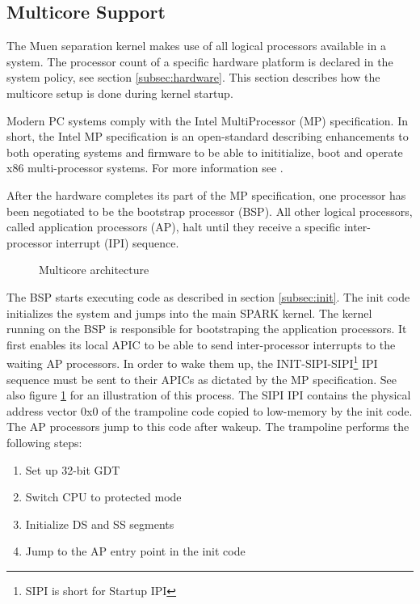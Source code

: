 \subsection{Multicore Support}\label{subsec:mp-support}
The Muen separation kernel makes use of all logical processors available in a
system. The processor count of a specific hardware platform is declared in the
system policy, see section \ref{subsec:hardware}. This section describes how
the multicore setup is done during kernel startup.

Modern PC systems comply with the Intel MultiProcessor (MP)
specification. In short, the Intel MP specification is an open-standard
describing enhancements to both operating systems and firmware to be able to
inititialize, boot and operate x86 multi-processor systems. For more information
see \cite{intel:mp}.

After the hardware completes its part of the MP specification, one processor
has been negotiated to be the bootstrap processor (BSP). All other
logical processors, called application processors (AP), halt until
they receive a specific inter-processor interrupt (IPI) sequence.

\begin{figure}[h]
	\centering
	
	\caption{Multicore architecture}
	\label{fig:mp-overview}
\end{figure}

The BSP starts executing code as described in section \ref{subsec:init}. The
init code initializes the system and jumps into the main SPARK kernel. The
kernel running on the BSP is responsible for bootstraping the application
processors. It first enables its local APIC to be able to send
inter-processor interrupts to the waiting AP processors. In order to wake them
up, the INIT-SIPI-SIPI\footnote{SIPI is short for Startup
IPI} IPI sequence must be sent to their
APICs as dictated by the MP specification. See also figure
\ref{fig:mp-overview} for an illustration of this process. The SIPI IPI
contains the physical address vector 0x0 of the trampoline code copied to
low-memory by the init code. The AP processors jump to this code after wakeup.
The trampoline performs the following steps:

\begin{enumerate}
	\item Set up 32-bit GDT
	\item Switch CPU to protected mode
	\item Initialize DS and SS segments
	\item Jump to the AP entry point in the init code
\end{enumerate}

